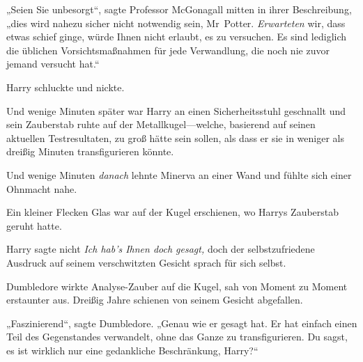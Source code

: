 „Seien Sie unbesorgt“, sagte Professor McGonagall mitten in ihrer Beschreibung, „dies wird nahezu sicher nicht notwendig sein, Mr~Potter. \emph{Erwarteten} wir, dass etwas schief ginge, würde Ihnen nicht erlaubt, es zu versuchen. Es sind lediglich die üblichen Vorsichtsmaßnahmen für jede Verwandlung, die noch nie zuvor jemand versucht hat.“

Harry schluckte und nickte.

Und wenige Minuten später war Harry an einen Sicherheitsstuhl geschnallt und sein Zauberstab ruhte auf der Metallkugel—welche, basierend auf seinen aktuellen Testresultaten, zu groß hätte sein sollen, als dass er sie in weniger als dreißig Minuten transfigurieren könnte.

Und wenige Minuten \emph{danach} lehnte Minerva an einer Wand und fühlte sich einer Ohnmacht nahe.

Ein kleiner Flecken Glas war auf der Kugel erschienen, wo Harrys Zauberstab geruht hatte.

Harry sagte nicht \emph{Ich hab’s Ihnen doch gesagt,} doch der selbstzufriedene Ausdruck auf seinem verschwitzten Gesicht sprach für sich selbst.

Dumbledore wirkte Analyse-Zauber auf die Kugel, sah von Moment zu Moment erstaunter aus. Dreißig Jahre schienen von seinem Gesicht abgefallen.

„Faszinierend“, sagte Dumbledore. „Genau wie er gesagt hat. Er hat einfach einen Teil des Gegenstandes verwandelt, ohne das Ganze zu transfigurieren. Du sagst, es ist wirklich nur eine gedankliche Beschränkung, Harry?“

